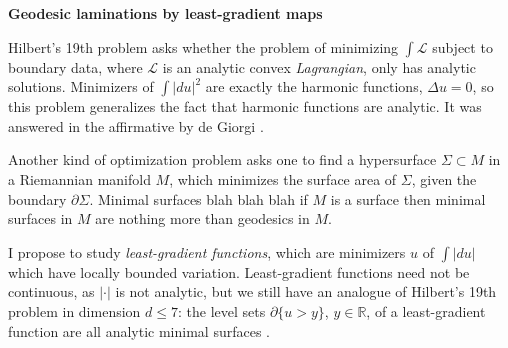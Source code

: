 \documentclass[11pt]{article}
\begin{document}
\begin{center}
\large{\bf Geodesic laminations by least-gradient maps} \\
\end{center}
%
%
%
%
%
%
Hilbert's 19th problem asks whether the problem of minimizing $\int \mathscr L$ subject to boundary data, where $\mathscr L$ is an analytic convex \emph{Lagrangian}, only has analytic solutions. Minimizers of $\int |du|^2$ are exactly the harmonic functions, $\Delta u = 0$, so this problem generalizes the fact that harmonic functions are analytic.
It was answered in the affirmative by de Giorgi \cite{deGiorgi57}.

Another kind of optimization problem asks one to find a hypersurface $\Sigma \subset M$ in a Riemannian manifold $M$, which minimizes the surface area of $\Sigma$, given the boundary $\partial \Sigma$.
Minimal surfaces blah blah blah if $M$ is a surface then minimal surfaces in $M$ are nothing more than geodesics in $M$.

I propose to study \emph{least-gradient functions}, which are minimizers $u$ of $\int |du|$ which have locally bounded variation.
Least-gradient functions need not be continuous, as $|\cdot|
$ is not analytic, but we still have an analogue of Hilbert's 19th problem in dimension $d \leq 7$: the level sets $\partial \{u > y\}$, $y \in \mathbb R$, of a least-gradient function are all analytic minimal surfaces \cite{Giusti77}.
\end{document}
